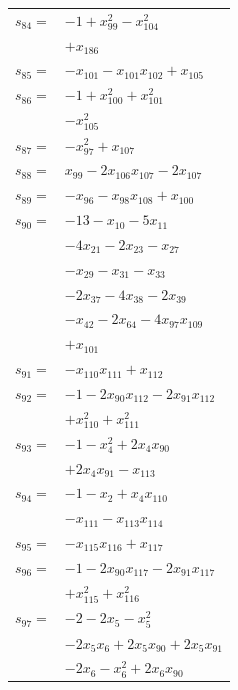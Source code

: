 \begin{longtable}{@{}r@{\;}l@{}}
\(s_{84}=\) & \(\displaystyle -1 +x_{99}^{2} -x_{104}^{2}\) \\
 & \(\displaystyle +x_{186}\) \\[3pt]
\(s_{85}=\) & \(\displaystyle -x_{101} -x_{101}x_{102} +x_{105}\) \\[3pt]
\(s_{86}=\) & \(\displaystyle -1 +x_{100}^{2} +x_{101}^{2}\) \\
 & \(\displaystyle -x_{105}^{2}\) \\[3pt]
\(s_{87}=\) & \(\displaystyle -x_{97}^{2} +x_{107}\) \\[3pt]
\(s_{88}=\) & \(\displaystyle x_{99} -2x_{106}x_{107} -2x_{107}\) \\[3pt]
\(s_{89}=\) & \(\displaystyle -x_{96} -x_{98}x_{108} +x_{100}\) \\[3pt]
\(s_{90}=\) & \(\displaystyle -13 -x_{10} -5x_{11}\) \\
 & \(\displaystyle -4x_{21} -2x_{23} -x_{27}\) \\
 & \(\displaystyle -x_{29} -x_{31} -x_{33}\) \\
 & \(\displaystyle -2x_{37} -4x_{38} -2x_{39}\) \\
 & \(\displaystyle -x_{42} -2x_{64} -4x_{97}x_{109}\) \\
 & \(\displaystyle +x_{101}\) \\[3pt]
\(s_{91}=\) & \(\displaystyle -x_{110}x_{111} +x_{112}\) \\[3pt]
\(s_{92}=\) & \(\displaystyle -1 -2x_{90}x_{112} -2x_{91}x_{112}\) \\
 & \(\displaystyle +x_{110}^{2} +x_{111}^{2}\) \\[3pt]
\(s_{93}=\) & \(\displaystyle -1 -x_{4}^{2} +2x_{4}x_{90}\) \\
 & \(\displaystyle +2x_{4}x_{91} -x_{113}\) \\[3pt]
\(s_{94}=\) & \(\displaystyle -1 -x_{2} +x_{4}x_{110}\) \\
 & \(\displaystyle -x_{111} -x_{113}x_{114}\) \\[3pt]
\(s_{95}=\) & \(\displaystyle -x_{115}x_{116} +x_{117}\) \\[3pt]
\(s_{96}=\) & \(\displaystyle -1 -2x_{90}x_{117} -2x_{91}x_{117}\) \\
 & \(\displaystyle +x_{115}^{2} +x_{116}^{2}\) \\[3pt]
\(s_{97}=\) & \(\displaystyle -2 -2x_{5} -x_{5}^{2}\) \\
 & \(\displaystyle -2x_{5}x_{6} +2x_{5}x_{90} +2x_{5}x_{91}\) \\
 & \(\displaystyle -2x_{6} -x_{6}^{2} +2x_{6}x_{90}\) \\

\end{longtable}
